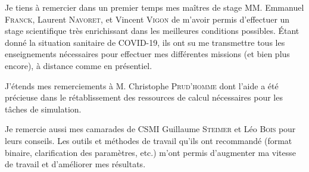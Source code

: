 \documentclass[ 
11pt, %
french, %
singlespacing, %
parskip, %
headsepline, %
openany, %
]{MastersDoctoralThesis} %
\begin{document}

\begin{acknowledgements}
\addchaptertocentry{\acknowledgementname} %
\qquad Je tiens à remercier dans un premier temps mes maîtres de stage MM. Emmanuel \textsc{Franck}, Laurent \textsc{Navoret}, et Vincent \textsc{Vigon} de m’avoir permis d’effectuer un stage scientifique très enrichissant dans les meilleures conditions possibles. Étant donné la situation sanitaire de COVID-19, ils ont su me transmettre tous les enseignements nécessaires pour effectuer mes différentes missions (et bien plus encore), à distance comme en présentiel.

\qquad J'étends mes remerciements à M. Christophe \textsc{Prud'homme} dont l'aide a été précieuse dans le rétablissement des ressources de calcul nécessaires pour les tâches de simulation.

\qquad Je remercie aussi mes camarades de CSMI Guillaume \textsc{Steimer} et Léo \textsc{Bois} pour leurs conseils. Les outils et méthodes de travail qu'ils ont recommandé (format binaire, clarification des paramètres, etc.) m'ont permis d'augmenter ma vitesse de travail et d'améliorer mes résultats.
\end{acknowledgements}


\tableofcontents %




% 
% 
\end{document}

